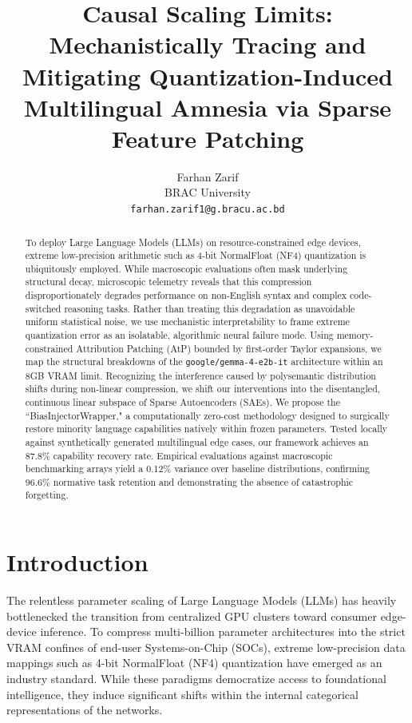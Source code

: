 \documentclass{article}
\title{Causal Scaling Limits: Mechanistically Tracing and Mitigating Quantization-Induced Multilingual Amnesia via Sparse Feature Patching}
\author{
  Farhan Zarif \\
  BRAC University \\
  \texttt{farhan.zarif1@g.bracu.ac.bd}
}
\begin{document}
\maketitle

\begin{abstract}
To deploy Large Language Models (LLMs) on resource-constrained edge devices, extreme low-precision arithmetic such as 4-bit NormalFloat (NF4) quantization is ubiquitously employed. While macroscopic evaluations often mask underlying structural decay, microscopic telemetry reveals that this compression disproportionately degrades performance on non-English syntax and complex code-switched reasoning tasks. Rather than treating this degradation as unavoidable uniform statistical noise, we use mechanistic interpretability to frame extreme quantization error as an isolatable, algorithmic neural failure mode. Using memory-constrained Attribution Patching (AtP) bounded by first-order Taylor expansions, we map the structural breakdowns of the \texttt{google/gemma-4-e2b-it} architecture within an 8GB VRAM limit. Recognizing the interference caused by polysemantic distribution shifts during non-linear compression, we shift our interventions into the disentangled, continuous linear subspace of Sparse Autoencoders (SAEs). We propose the ``BiasInjectorWrapper," a computationally zero-cost methodology designed to surgically restore minority language capabilities natively within frozen parameters. Tested locally against synthetically generated multilingual edge cases, our framework achieves an 87.8\% capability recovery rate. Empirical evaluations against macroscopic benchmarking arrays yield a 0.12\% variance over baseline distributions, confirming 96.6\% normative task retention and demonstrating the absence of catastrophic forgetting.
\end{abstract}

\section{Introduction}

The relentless parameter scaling of Large Language Models (LLMs) has heavily bottlenecked the transition from centralized GPU clusters toward consumer edge-device inference. To compress multi-billion parameter architectures into the strict VRAM confines of end-user Systems-on-Chip (SOCs), extreme low-precision data mappings such as 4-bit NormalFloat (NF4) quantization \cite{dettmers2023qlora} have emerged as an industry standard. While these paradigms democratize access to foundational intelligence, they induce significant shifts within the internal categorical representations of the networks.
\end{document}
